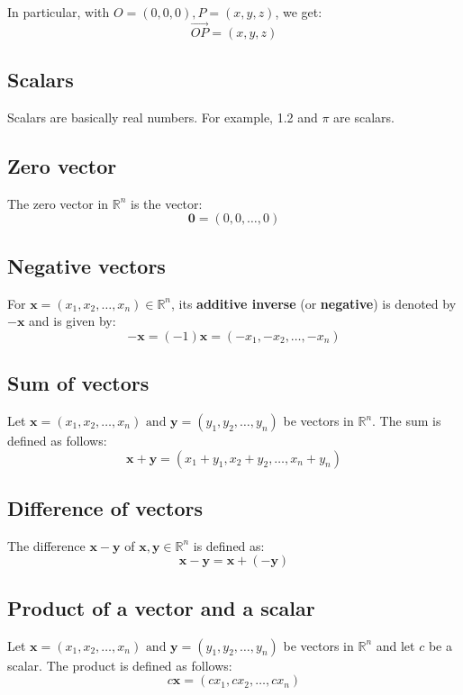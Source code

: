 \documentclass[11pt]{article}
\begin{document}
In particular, with \(O = (0, 0, 0), P = (x, y, z)\), we get:
\[\overrightarrow{OP} = (x, y, z)\]

\subsection{Scalars}
\label{sec:org5cc125b}
Scalars are basically real numbers. For example, 1.2 and \(\pi\) are scalars.

\subsection{Zero vector}
\label{sec:orgcffde1e}
The zero vector in \(\mathbb{R}^n\) is the vector:
\[\boldsymbol{0} = (0, 0, \ldots, 0)\]

\subsection{Negative vectors}
\label{sec:org4906cd1}
For \(\boldsymbol{x} = (x_1, x_2, \ldots, x_n) \in \mathbb{R}^n\), its \textbf{additive inverse} (or \textbf{negative}) is denoted by \(- \boldsymbol{x}\) and is given by:
\[- \boldsymbol{x} = (-1) \boldsymbol{x} = (-x_1, -x_2, \ldots, -x_n)\]

\subsection{Sum of vectors}
\label{sec:orgbca5eed}
Let \(\boldsymbol{x} = (x_1, x_2, \ldots, x_n) \text{ and } \boldsymbol{y} = (y_1, y_2, \ldots, y_n)\) be vectors in \(\mathbb{R}^n\). The sum is defined as follows:
\[\boldsymbol{x} + \boldsymbol{y} = (x_1 + y_1, x_2 + y_2, \ldots, x_n + y_n)\]

\subsection{Difference of vectors}
\label{sec:orga6139b1}
The difference \(\boldsymbol{x} - \boldsymbol{y}\) of \(\boldsymbol{x}, \boldsymbol{y} \in \mathbb{R}^n\) is defined as:
\[\boldsymbol{x} - \boldsymbol{y} = \boldsymbol{x} + (- \boldsymbol{y})\]

\subsection{Product of a vector and a scalar}
\label{sec:org75fccc1}
Let \(\boldsymbol{x} = (x_1, x_2, \ldots, x_n) \text{ and } \boldsymbol{y} = (y_1, y_2, \ldots, y_n)\) be vectors in \(\mathbb{R}^n\) and let \(c\) be a scalar. The product is defined as follows:
\[c \boldsymbol{x} = (cx_1, cx_2, \ldots, cx_n)\]
\end{document}
